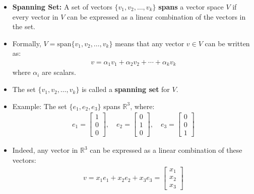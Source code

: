 \begin{frame}
    \begin{itemize}
        \item \textbf{Spanning Set:} A set of vectors $\{v_1, v_2, \ldots, v_k\}$ \textbf{spans } a vector space $V$ if every vector in $V$ can be expressed as a linear combination of the vectors in the set.
        \item Formally, $V = \text{span}\{v_1, v_2, \ldots, v_k\}$ means that any vector $v \in V$ can be written as:
        \begin{align*}
            v = \alpha_1 v_1 + \alpha_2 v_2 + \cdots + \alpha_k v_k
        \end{align*}
        where $\alpha_i$ are scalars.
        \item The set $\{v_1, v_2, \ldots, v_k\}$ is called a \textbf{spanning set} for $V$.  
    \end{itemize}
\end{frame}
\begin{frame}
    \begin{itemize}
        \item Example: The set $\{e_1, e_2, e_3\}$ spans $\mathbb{R}^3$, where:
            \begin{align*}
                e_1 = \begin{bmatrix} 1 \\ 0 \\ 0 \end{bmatrix}, \quad
                e_2 = \begin{bmatrix} 0 \\ 1 \\ 0 \end{bmatrix}, \quad
                e_3 = \begin{bmatrix} 0 \\ 0 \\ 1 \end{bmatrix}
            \end{align*}
          \item Indeed, any vector in $\mathbb{R}^3$ can be expressed as a linear combination of these vectors:
            \begin{align*}
                v = x_1 e_1 + x_2 e_2 + x_3 e_3 = \begin{bmatrix} x_1 \\ x_2 \\ x_3 \end{bmatrix}
            \end{align*} 
    \end{itemize}
\end{frame}

